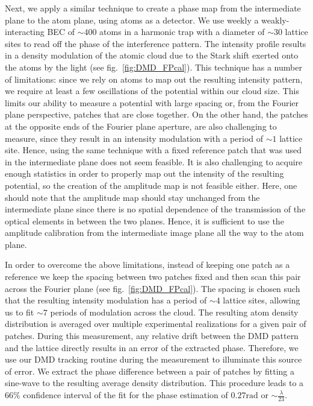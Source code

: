Next, we apply a similar technique to create a phase map from the intermediate plane to the atom plane, using atoms as a detector. We use weekly a weakly-interacting BEC of $\sim 400$ atoms in a harmonic trap with a diameter of $\sim 30$ lattice sites to read off the phase of the interference pattern. The intensity profile results in a density modulation of the atomic cloud due to the Stark shift exerted onto the atoms by the light (see fig.~\ref{fig:DMD_FPcal}). This technique has a number of limitations: since we rely on atoms to map out the resulting intensity pattern, we require at least a few oscillations of the potential within our cloud size. This limits our ability to measure a potential with large spacing or, from the Fourier plane perspective, patches that are close together. On the other hand, the patches at the opposite ends of the Fourier plane aperture, are also challenging to measure, since they result in an intensity modulation with a period of $\sim 1$ lattice site. Hence, using the same technique with a fixed reference patch that was used in the intermediate plane does not seem feasible. It is also challenging to acquire enough statistics in order to properly map out the intensity of the resulting potential, so the creation of the amplitude map is not feasible either. Here, one should note that the amplitude map should stay unchanged from the intermediate plane since there is no spatial dependence of the transmission of the optical elements in between the two planes. Hence, it is sufficient to use the amplitude calibration from the intermediate image plane all the way to the atom plane.

In order to overcome the above limitations, instead of keeping one patch as a reference we keep the spacing between two patches fixed and then scan this pair across the Fourier plane (see fig.~\ref{fig:DMD_FPcal}). The spacing is chosen such that the resulting intensity modulation has a period of $\sim 4$ lattice sites, allowing us to fit $\sim 7$ periods of modulation across the cloud. The resulting atom density distribution is averaged over multiple experimental realizations for a given pair of patches. During this measurement, any relative drift between the DMD pattern and the lattice directly results in an error of the extracted phase. Therefore, we use our DMD tracking routine during the measurement to illuminate this source of error. We extract the phase difference between a pair of patches by fitting a sine-wave to the resulting average density distribution. This procedure leads to a $66\%$ confidence interval of the fit for the phase estimation of $0.27 \mathrm{rad}$ or $\sim \frac{\lambda}{23}$.

